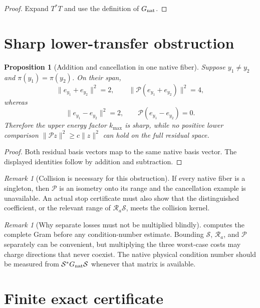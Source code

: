 \documentclass[11pt]{article}
\newtheorem{proposition}[theorem]{Proposition}
\theoremstyle{definition}
\theoremstyle{remark}
\newtheorem{remark}[theorem]{Remark}
\newcommand{\Res}{\mathcal R}
\newcommand{\Nat}{\mathcal P}
\newcommand{\Syn}{\mathcal S}
\begin{document}
\begin{proof}
Expand \(T^*T\) and use the definition of \(G_{\rm nat}\).
\end{proof}

\section{Sharp lower-transfer obstruction}

\begin{proposition}[Addition and cancellation in one native fiber]
\label{prop:cancellation}
Suppose \(y_1\ne y_2\) and \(\pi(y_1)=\pi(y_2)\).  On their span,
\[
 \|e_{y_1}+e_{y_2}\|^2=2,\qquad
 \|\Nat(e_{y_1}+e_{y_2})\|^2=4,
\]
whereas
\[
 \|e_{y_1}-e_{y_2}\|^2=2,\qquad
 \Nat(e_{y_1}-e_{y_2})=0.
\]
Therefore the upper energy factor \(k_{\max}\) is sharp, while no
positive lower comparison
\(\|\Nat z\|^2\ge c\|z\|^2\) can hold on the full residual space.
\end{proposition}

\begin{proof}
Both residual basis vectors map to the same native basis vector.
The displayed identities follow by addition and subtraction.
\end{proof}

\begin{remark}[Collision is necessary for this obstruction]
If every native fiber is a singleton, then \(\Nat\) is an isometry
onto its range and the cancellation example is unavailable.  An
actual stop certificate must also show that the distinguished
coefficient, or the relevant range of \(\Res_a\Syn\), meets the
collision kernel.
\end{remark}

\begin{remark}[Why separate losses must not be multiplied blindly]
 computes the complete Gram before any
condition-number estimate.  Bounding \(\Syn\), \(\Res_a\), and
\(\Nat\) separately can be convenient, but multiplying the three
worst-case costs may charge directions that never coexist.  The
native physical condition number should be measured from
\(\Syn^*G_{\rm nat}\Syn\) whenever that matrix is available.
\end{remark}

\section{Finite exact certificate}
\end{document}
